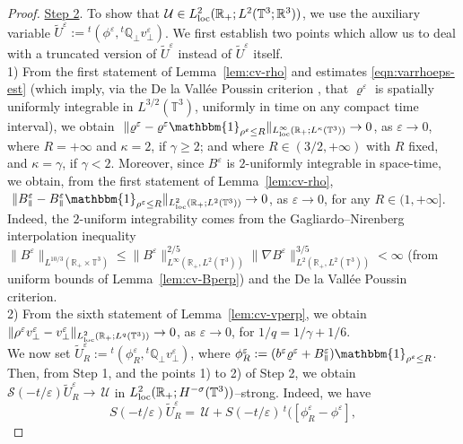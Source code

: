 \documentclass[11pt,reqno]{amsart}
\def \R{{\mathbb{R}}}
\def \Q{{\mathbb{Q}}}
\def \T{{\mathbb{T}}}
\newcommand{\myparallel}{{\mkern3mu\vphantom{\perp}\vrule depth 0pt\mkern2mu\vrule depth 0pt\mkern3mu}}
\begin{document}
\begin{proof}
  
 \underline{Step 2}. To show that $ \mathcal U \in  L_{\rm loc}^{2}(\R_+;  L^2(\T^3;\R^3))$, we use the auxiliary variable $\widetilde U^\varepsilon:={}^t(\phi^\varepsilon, {}^t\Q_\perp v_\perp^\varepsilon)$. We first establish two points which allow us to deal with a truncated version of $\widetilde U^\varepsilon$ instead of $\widetilde U^\varepsilon$ itself.\\
1) From the first statement of Lemma~\ref{lem:cv-rho} and estimates \eqref{eqn:varrhoeps-est} (which imply, via the De la Vall\'ee Poussin criterion \cite{FL07}, that   $\varrho^\varepsilon$ is spatially uniformly integrable in $L^{3/2}(\T^3)$, uniformly in time on any compact time interval), we obtain $\ \|\varrho^\varepsilon- \varrho^\varepsilon \mathbbm{1}_{\rho^\varepsilon\leq R}\|_{L_{\rm loc}^\infty(\R_+;L^\kappa(\T^3))} \rightarrow 0$, as $\varepsilon \rightarrow 0$, where $R=+\infty$ and $\kappa=2$, if $\gamma\geq 2$; and where $R\in(3/2,+\infty)$ with $R$ fixed, and $\kappa=\gamma$, if $\gamma <2$. Moreover, since $B^\varepsilon$ is $2$-uniformly integrable in space-time,  we obtain, from the first statement of Lemma~\ref{lem:cv-rho}, $\ \|  B_\myparallel^\varepsilon-  B_\myparallel^\varepsilon \mathbbm{1}_{\rho^\varepsilon\leq R}\|_{L_{\rm loc}^2(\R_+;L^2(\T^3))} \rightarrow 0$, as $\varepsilon \rightarrow 0$, for any $R\in (1,+\infty]$. Indeed,  the $2$-uniform integrability comes from the Gagliardo--Nirenberg interpolation inequality $\|B^\varepsilon \|_{L^{10/3}(\R_+ \times \T^3)} \leq \|B^\varepsilon \|_{L^{\infty}(\R_+,L^2(\T^3))}^{2/5}\|\nabla B^\varepsilon \|_{L^{2}(\R_+,L^2(\T^3))}^{3/5} < \infty$ (from uniform bounds of Lemma~\ref{lem:cv-Bperp}) and the De la Vall\'ee Poussin criterion.\\
2) From the sixth statement of Lemma~\ref{lem:cv-vperp}, we obtain $\|\rho^\varepsilon v_\perp^\varepsilon -v_\perp^\varepsilon \|_{L_{\rm loc}^2(\R_+;L^q(\T^3))} \rightarrow 0$, as $\varepsilon \rightarrow 0$, for $1/q=1/\gamma+1/6$. \\
We now set $\widetilde U_R^\varepsilon:={}^t(\phi_R^\varepsilon, {}^t\Q_\perp v_\perp^\varepsilon)$,   where $\phi_R^\varepsilon := (b^\varepsilon \varrho^\varepsilon + B_\myparallel^\varepsilon)\mathbbm{1}_{\rho^\varepsilon\leq R}$. Then, from Step 1, and the points 1) to 2) of Step 2, we obtain $\mathcal S(-t/\varepsilon) \widetilde U_R^\varepsilon \rightarrow \, \mathcal U$ in  $ L_{\rm loc}^{2}(\R_+; H^{-\sigma}(\T^3))$--strong. Indeed, we have
\begin{equation}
    \label{eqn:regU}
    S(-t/\varepsilon) \widetilde U_R^\varepsilon=\, \mathcal U + S(-t/\varepsilon) \,{}^t\big ( [\phi_R^\varepsilon -\phi^\varepsilon],

\end{equation}
\end{proof}
\end{document}
